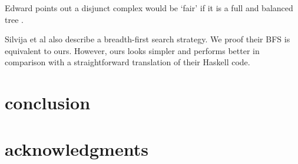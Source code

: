 \documentclass[format=acmlarge, review=true, authordraft=true]{acmart}
\begin{document}
Edward points out a disjunct complex would be `fair' if it is a full and balanced tree \citep{yang2010adventures}.

Silvija et al \citep{seres1999algebra} also describe a breadth-first search strategy. We proof their BFS is equivalent to ours. However, ours looks simpler and performs better in comparison with a straightforward translation of their Haskell code.

\section{conclusion}




\section*{acknowledgments}



\end{document}
